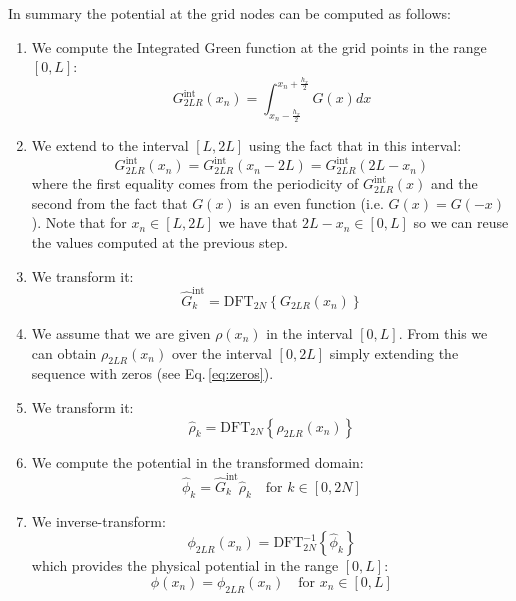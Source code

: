 In summary the potential at the grid nodes can be computed as follows:
\begin{enumerate}
\item We compute the Integrated Green function at the grid points in the range $[0, L]$:
\begin{equation}
G_{2LR}^\text{int}(x_n) = \int_{x_n-\frac{h_x}{2}}^{x_n+\frac{h_x}{2}} G(x) dx
\end{equation}
\item We extend to the interval $[L, 2L]$ using the fact that in this interval:
\begin{equation}
G^\text{int}_{2LR}(x_n) = G^\text{int}_{2LR}(x_n-2L) =  G^\text{int}_{2LR}(2L-x_n)
\end{equation}
where the first equality comes from the periodicity of $G^\text{int}_{2LR}(x)$ and the second from the fact that $G(x)$ is an even function (i.e. $G(x) = G(-x)$).
Note that for $x_n \in [L, 2L]$ we have that $2L-x_n \in [0, L]$ so we can reuse the values computed at the previous step.
\item We transform it:
\begin{equation}
\hat{G}^\text{int}_k = \text{DFT}_{2N}\left\{ G_{2LR}(x_n)\right\}
\end{equation}
\item We assume that we are given $\rho(x_n)$ in the interval $[0, L]$. From this we can obtain $\rho_{2LR}(x_n)$ over the interval $[0, 2L]$ simply extending the sequence with zeros (see Eq.\,\eqref{eq:zeros}).
\item We transform it:
\begin{equation}
\hat{\rho}_k = \text{DFT}_{2N}\left\{ \rho_{2LR}(x_n)\right\}
\end{equation}
\item We compute the potential in the transformed domain:
\begin{equation}
\hat{\phi}_k = \hat{G}^\text{int}_k \hat{\rho}_k \quad \text{for } k\in [0, 2N]
\end{equation}
\item We inverse-transform:
\begin{equation}
\phi_{2LR}(x_n)  = \text{DFT}_{2N}^{-1}\left\{\hat{\phi}_k\right\}
\end{equation}
which provides the physical potential in the range $[0, L]$:
\begin{equation}
\phi(x_n)  = \phi_{2LR}(x_n)  \quad \text{for } x_n\in [0, L]
\end{equation}
\end{enumerate}





